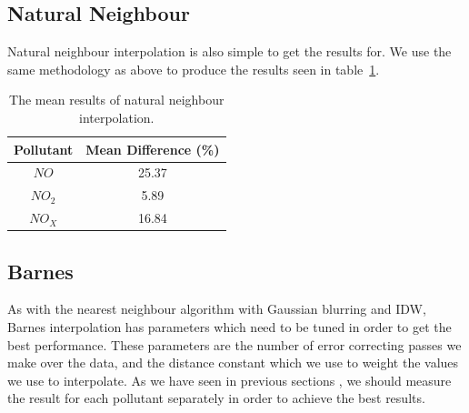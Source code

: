         \subsection{Natural Neighbour}\label{prediction_evaluation_results_natural_neighbour}


        	Natural neighbour interpolation is also simple to get the results for. We use the same methodology as above to produce the results seen in table~\ref{tab:natural_neighbour_results}.

        	\begin{table}[H]
				\centering
	    		\begin{tabular}{|c|c|}
	    			\hline
					Pollutant & Mean Difference (\%) \\ \hline
					$NO$ & 25.37 \\
					$NO_{2}$ & 5.89 \\
					$NO_{X}$ & 16.84 \\
					\hline
				\end{tabular}
				\caption{The mean results of natural neighbour interpolation.}
				\label{tab:natural_neighbour_results}
			\end{table} 

        \subsection{Barnes}\label{prediction_evaluation_results_barnes}



        	As with the nearest neighbour algorithm with Gaussian blurring and IDW, Barnes interpolation has parameters which need to be tuned in order to get the best performance. These parameters are the number of error correcting passes we make over the data, and the distance constant which we use to weight the values we use to interpolate. As we have seen in previous sections , we should measure the result for each pollutant separately in order to achieve the best results. 

